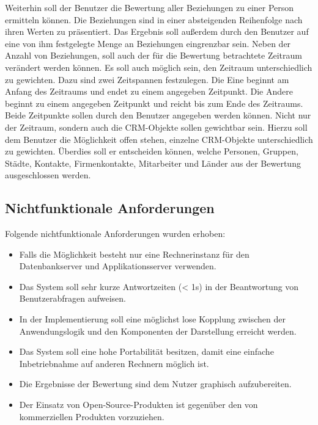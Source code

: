 Weiterhin soll der Benutzer die Bewertung aller Beziehungen zu einer Person ermitteln können. Die Beziehungen sind in einer absteigenden Reihenfolge nach ihren Werten zu präsentiert. Das Ergebnis soll außerdem durch den Benutzer auf eine von ihm festgelegte Menge an Beziehungen eingrenzbar sein. Neben der Anzahl von Beziehungen, soll auch der für die Bewertung betrachtete Zeitraum verändert werden können. Es soll auch möglich sein, den Zeitraum unterschiedlich zu gewichten. Dazu sind zwei Zeitspannen festzulegen. Die Eine beginnt am Anfang des Zeitraums und endet zu einem angegeben Zeitpunkt. Die Andere beginnt zu einem angegeben Zeitpunkt und reicht bis zum Ende des Zeitraums. Beide Zeitpunkte sollen durch den Benutzer angegeben werden können. Nicht nur der Zeitraum, sondern auch die CRM-Objekte sollen gewichtbar sein. Hierzu soll dem Benutzer die Möglichkeit offen stehen, einzelne CRM-Objekte unterschiedlich zu gewichten. Überdies soll er entscheiden können, welche Personen, Gruppen, Städte, Kontakte, Firmenkontakte, Mitarbeiter und Länder aus der Bewertung ausgeschlossen werden.

\subsection{Nichtfunktionale Anforderungen}

Folgende nichtfunktionale Anforderungen wurden erhoben:

\begin{itemize}
	
	\item Falls die Möglichkeit besteht nur eine Rechnerinstanz für den Datenbankserver und Applikationsserver verwenden.
	
	\item Das System soll sehr kurze Antwortzeiten (< 1s) in der Beantwortung von Benutzerabfragen aufweisen. 
	
	\item In der Implementierung soll eine möglichst lose Kopplung zwischen der Anwendungslogik und den Komponenten der Darstellung erreicht werden.
	
	\item Das System soll eine hohe Portabilität besitzen, damit eine einfache Inbetriebnahme auf anderen Rechnern möglich ist.
	
	\item Die Ergebnisse der Bewertung sind dem Nutzer graphisch aufzubereiten. 
	
	\item Der Einsatz von Open-Source-Produkten ist gegenüber den von kommerziellen Produkten vorzuziehen.

\end{itemize}

